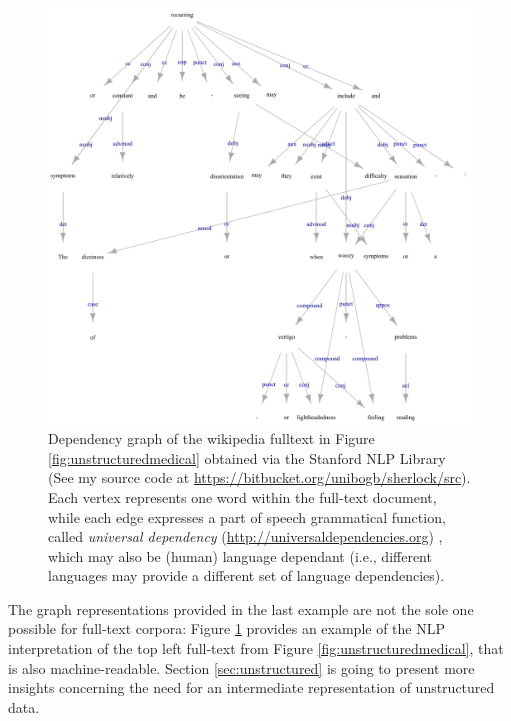 \begin{figure}
\hspace*{-2cm}
  \includegraphics[width=1.3\textwidth]{fig/01dataint/recurringgrapj.pdf}
  \caption{Dependency graph of the wikipedia fulltext in Figure \ref{fig:unstructuredmedical} obtained via the Stanford NLP Library (See my source code at \url{https://bitbucket.org/unibogb/sherlock/src}). Each vertex represents one word within the full-text document, while each edge expresses a part of speech grammatical function, called \textit{universal dependency} (\url{http://universaldependencies.org}) \cite{MarneffeDSHGNM14}, which may also be (human) language dependant (i.e., different languages may provide a different set of language dependencies).}
  \label{fig:dependencygraphexample}
\end{figure}

The graph representations provided in the last example are not the sole one possible for full-text corpora: Figure \ref{fig:dependencygraphexample} provides an example of the NLP interpretation of the top left full-text from Figure \ref{fig:unstructuredmedical}, that is also machine-readable. Section \vref{sec:unstructured} is going to present more insights concerning the need for an intermediate representation of unstructured data.

